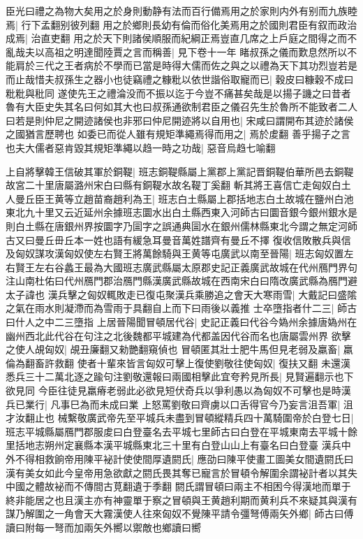 臣光曰禮之為物大矣用之於身則動静有法而百行備焉用之於家則内外有别而九族睦焉|{
	行下孟翻别彼列翻}
用之於鄉則長幼有倫而俗化美焉用之於國則君臣有叙而政治成焉|{
	治直吏翻}
用之於天下則諸侯順服而紀綱正焉豈直几席之上戶庭之間得之而不亂哉夫以高祖之明達聞陸賈之言而稱善|{
	見下卷十一年}
睹叔孫之儀而歎息然所以不能肩於三代之王者病於不學而已當是時得大儒而佐之與之以禮為天下其功烈豈若是而止哉惜夫叔孫生之器小也徒竊禮之糠粃以依世諧俗取寵而已|{
	穀皮曰糠穀不成曰粃粃與秕同}
遂使先王之禮淪没而不振以迄于今豈不痛甚矣哉是以揚子譏之曰昔者魯有大臣史失其名曰何如其大也曰叔孫通欲制君臣之儀召先生於魯所不能致者二人曰若是則仲尼之開迹諸侯也非邪曰仲尼開迹將以自用也|{
	宋咸曰謂開布其迹於諸侯之國猶言歷聘也}
如委已而從人雖有規矩準繩焉得而用之|{
	焉於䖍翻}
善乎揚子之言也夫大儒者惡肯毀其規矩準繩以趋一時之功哉|{
	惡音烏趋七喻翻}


上自將擊韓王信破其軍於銅鞮|{
	班志銅鞮縣屬上黨郡上黨記晋銅鞮伯華所邑去銅鞮故宮二十里唐屬潞州宋白曰縣有銅鞮水故名鞮丁奚翻}
斬其將王喜信亡走匈奴白土人曼丘臣王黄等立趙苗裔趙利為王|{
	班志白土縣屬上郡括地志白土故城在鹽州白池東北九十里又云近延州余據班志圜水出白土縣西東入河師古曰圜音銀今銀州銀水是則白土縣在唐銀州界按圜字乃圁字之誤通典圁水在銀州儒林縣東北今謂之無定河師古又曰曼丘毌丘本一姓也語有緩急耳曼音萬姓譜齊有曼丘不擇}
復收信敗散兵與信及匈奴謀攻漢匈奴使左右賢王將萬餘騎與王黄等屯廣武以南至晉陽|{
	班志匈奴置左右賢王左右谷蠡王最為大國班志廣武縣屬太原郡史記正義廣武故城在代州鴈門界句注山南杜佑曰代州鴈門郡治鴈門縣漢廣武縣故城在西南宋白曰隋改廣武縣為鴈門避太子諱也}
漢兵擊之匈奴輒敗走已復屯聚漢兵乘勝追之會天大寒雨雪|{
	大戴記曰盛隂之氣在雨水則凝滯而為雪雨于具翻自上而下曰雨後以義推}
士卒墮指者什二三|{
	師古曰什人之中二三墮指}
上居晉陽聞冒頓居代谷|{
	史記正義曰代谷今媯州余據唐媯州在幽州西北此代谷在句注之北後魏都平城建為代都盖因代谷而名也唐屬雲州界}
欲擊之使人覘匈奴|{
	覘丑廉翻又勑艷翻窺偵也}
冒頓匿其壯士肥牛馬但見老弱及羸畜|{
	羸倫為翻畜許救翻}
使者十輩來皆言匈奴可擊上復使劉敬往使匈奴|{
	復扶又翻}
未還漢悉兵三十二萬北逐之踰句注劉敬還報曰兩國相擊此宜夸矜見所長|{
	見賢遍翻示也下欲見同}
今臣往徒見羸瘠老弱此必欲見短伏奇兵以爭利愚以為匈奴不可擊也是時漢兵已業行|{
	凡事巳為而未成曰業}
上怒罵劉敬曰齊虜以口舌得官今乃妄言沮吾軍|{
	沮才汝翻止也}
械繫敬廣武帝先至平城兵未盡到冒頓縱精兵四十萬騎圍帝於白登七日|{
	班志平城縣屬鴈門郡服䖍曰白登臺名去平城七里師古曰白登在平城東南去平城十餘里括地志朔州定襄縣本漢平城縣東北三十里有白登山山上有臺名曰白登臺}
漢兵中外不得相救餉帝用陳平袐計使使間厚遺閼氏|{
	應劭曰陳平使畫工圖美女間遺閼氏曰漢有美女如此今皇帝用急欲獻之閼氏畏其奪已寵言於冒頓令解圍余謂袐計者以其失中國之體故袐而不傳間古莧翻遺于季翻}
閼氏謂冒頓曰兩主不相困今得漢地而單于終非能居之也且漢主亦有神靈單于察之冒頓與王黄趙利期而黄利兵不來疑其與漢有謀乃解圍之一角會天大霧漢使人往來匈奴不覺陳平請令彊弩傅兩矢外鄉|{
	師古曰傅讀曰附每一弩而加兩矢外嚮以禦敵也鄉讀曰嚮}
